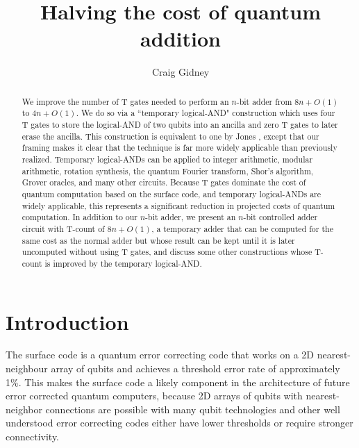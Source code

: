 \documentclass[twocolumn]{quantumarticle-customized}
\begin{document}
\title{Halving the cost of quantum addition}
\author{Craig Gidney}

\begin{abstract}
We improve the number of T gates needed to perform an $n$-bit adder from $8n + O(1)$ \cite{Amy2013, Cuccaro2004, AustinDiscussionsAndEmails2017} to $4n + O(1)$.
We do so via a ``temporary logical-AND" construction which uses four T gates to store the logical-AND of two qubits into an ancilla and zero T gates to later erase the ancilla.
This construction is equivalent to one by Jones \cite{Jones2013}, except that our framing makes it clear that the technique is far more widely applicable than previously realized.
Temporary logical-ANDs can be applied to integer arithmetic, modular arithmetic, rotation synthesis, the quantum Fourier transform, Shor's algorithm, Grover oracles, and many other circuits.
Because T gates dominate the cost of quantum computation based on the surface code, and temporary logical-ANDs are widely applicable, this represents a significant reduction in projected costs of quantum computation.
In addition to our $n$-bit adder, we present an $n$-bit controlled adder circuit with T-count of $8n + O(1)$, a temporary adder that can be computed for the same cost as the normal adder but whose result can be kept until it is later uncomputed without using T gates, and discuss some other constructions whose T-count is improved by the temporary logical-AND.
\end{abstract}

\maketitle

\section*{Introduction}

The surface code \cite{Brav98,Denn02,Raus07,Raus07d,Fowler2012} is a quantum error correcting code that works on a 2D nearest-neighbour array of qubits and achieves a threshold error rate of approximately 1\%.
This makes the surface code a likely component in the architecture of future error corrected quantum computers, because 2D arrays of qubits with nearest-neighbor connections are possible with many qubit technologies \cite{Schl11,Bare13,Gamb17,Leik17,Laht17} and other well understood error correcting codes either have lower thresholds or require stronger connectivity.
\end{document}
